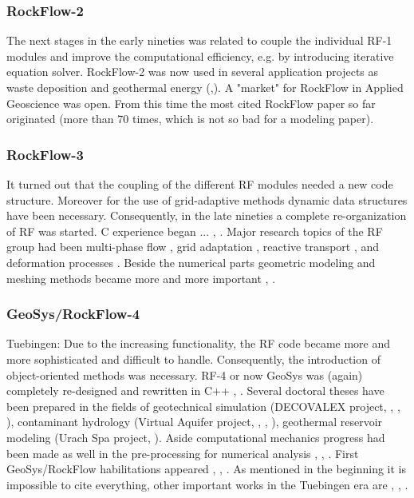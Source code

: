 \subsubsection*{RockFlow-2}

The next stages in the early nineties was related to couple the individual RF-1 modules and improve the computational efficiency, e.g. by introducing iterative equation solver. RockFlow-2 was now used in several application projects as waste deposition and geothermal energy (\cite{Leg:1995},\cite{Kol:1996}). A "market" for RockFlow in Applied Geoscience was open.
From this time the most cited RockFlow paper so far \cite{KolRatDieZie:98} originated (more than 70 times, which is not so bad for a modeling paper).

\subsubsection*{RockFlow-3}

It turned out that the coupling of the different RF modules needed a new code structure.
Moreover for the use of grid-adaptive methods dynamic data structures have been necessary.
Consequently, in the late nineties a complete re-organization of RF was started. C experience began ...
\cite{MSR:1996}, \cite{Bar:1997}.
Major research topics of the RF group had been multi-phase flow \cite{Tho:01}, grid adaptation \cite{Kai:01}, reactive transport \cite{Hab:01}, and deformation processes
\cite{Koh:2006}. Beside the numerical parts geometric modeling and meshing methods became more and more important \cite{Rot:01}, \cite{Moe:2004}.

\subsubsection*{GeoSys/RockFlow-4}

Tuebingen:
Due to the increasing functionality, the RF code became more and more sophisticated and difficult to handle.
Consequently, the introduction of object-oriented methods was necessary. RF-4 or now GeoSys was (again) completely re-designed and rewritten in C++
\cite{oK04}, \cite{wW06}.
Several doctoral theses have been prepared in the fields of geotechnical simulation (DECOVALEX project, \cite{Eng:03}, \cite{deJ:2004}, \cite{Wal:2007}), contaminant hydrology (Virtual Aquifer project, \cite{Bei:2005}, \cite{Bey:2007}, \cite{Mil:2007}), geothermal reservoir modeling (Urach Spa project, \cite{Ten:2006}).
Aside computational mechanics progress had been made as well in the pre-processing for numerical analysis \cite{Kal:2006}, \cite{Gro:2006}, \cite{Che:2006}.
First GeoSys/RockFlow habilitations appeared \cite{Bau:2006}, \cite{McD:2006}, \cite{Kos:2007}.
As mentioned in the beginning it is impossible to cite everything, other important works in the Tuebingen era are \cite{ParEtAl:2007}, \cite{KolEtAl:2007}, \cite{XieEtAl:2006}.

